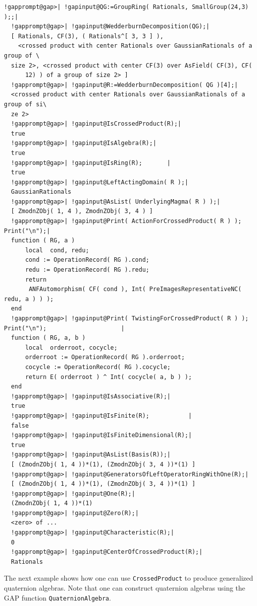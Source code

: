 \documentclass[a4paper,11pt]{report}
\begin{document}
{{{\begin{Verbatim}[commandchars=!@|,fontsize=\small,frame=single,label=Example]
  !gapprompt@gap>| !gapinput@QG:=GroupRing( Rationals, SmallGroup(24,3) );;|
  !gapprompt@gap>| !gapinput@WedderburnDecomposition(QG);|
  [ Rationals, CF(3), ( Rationals^[ 3, 3 ] ),
    <crossed product with center Rationals over GaussianRationals of a group of \
  size 2>, <crossed product with center CF(3) over AsField( CF(3), CF(
      12) ) of a group of size 2> ]
  !gapprompt@gap>| !gapinput@R:=WedderburnDecomposition( QG )[4];|
  <crossed product with center Rationals over GaussianRationals of a group of si\
  ze 2>
  !gapprompt@gap>| !gapinput@IsCrossedProduct(R);|
  true
  !gapprompt@gap>| !gapinput@IsAlgebra(R);|
  true
  !gapprompt@gap>| !gapinput@IsRing(R);       |
  true
  !gapprompt@gap>| !gapinput@LeftActingDomain( R );|
  GaussianRationals
  !gapprompt@gap>| !gapinput@AsList( UnderlyingMagma( R ) );|
  [ ZmodnZObj( 1, 4 ), ZmodnZObj( 3, 4 ) ]
  !gapprompt@gap>| !gapinput@Print( ActionForCrossedProduct( R ) ); Print("\n");|
  function ( RG, a )
      local  cond, redu;
      cond := OperationRecord( RG ).cond;
      redu := OperationRecord( RG ).redu;
      return
       ANFAutomorphism( CF( cond ), Int( PreImagesRepresentativeNC( redu, a ) ) );
  end
  !gapprompt@gap>| !gapinput@Print( TwistingForCrossedProduct( R ) ); Print("\n");                     |
  function ( RG, a, b )
      local  orderroot, cocycle;
      orderroot := OperationRecord( RG ).orderroot;
      cocycle := OperationRecord( RG ).cocycle;
      return E( orderroot ) ^ Int( cocycle( a, b ) );
  end
  !gapprompt@gap>| !gapinput@IsAssociative(R);|
  true
  !gapprompt@gap>| !gapinput@IsFinite(R);           |
  false
  !gapprompt@gap>| !gapinput@IsFiniteDimensional(R);|
  true
  !gapprompt@gap>| !gapinput@AsList(Basis(R));|
  [ (ZmodnZObj( 1, 4 ))*(1), (ZmodnZObj( 3, 4 ))*(1) ] 
  !gapprompt@gap>| !gapinput@GeneratorsOfLeftOperatorRingWithOne(R);|
  [ (ZmodnZObj( 1, 4 ))*(1), (ZmodnZObj( 3, 4 ))*(1) ]
  !gapprompt@gap>| !gapinput@One(R);|
  (ZmodnZObj( 1, 4 ))*(1)
  !gapprompt@gap>| !gapinput@Zero(R);|
  <zero> of ...
  !gapprompt@gap>| !gapinput@Characteristic(R);|
  0
  !gapprompt@gap>| !gapinput@CenterOfCrossedProduct(R);|
  Rationals
\end{Verbatim}
 The next example shows how one can use \texttt{CrossedProduct} to produce generalized quaternion algebras. Note that one can construct
quaternion algebras using the \textsf{GAP} function \texttt{QuaternionAlgebra}.  
\begin{Verbatim}[commandchars=@|B,fontsize=\small,frame=single,label=Example]

\end{Verbatim}}}}
\end{document}
